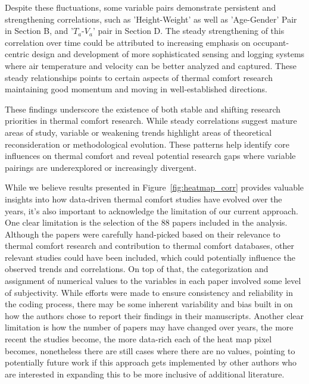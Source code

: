 \documentclass[final,3p,times,12pt]{elsarticle}
\begin{document}
Despite these fluctuations, some variable pairs demonstrate persistent and strengthening correlations, such as 'Height-Weight' as well as 'Age-Gender' Pair in Section B, and '$T_a$-$V_a$' pair in Section D. The steady strengthening of this correlation over time could be attributed to increasing emphasis on occupant-centric design and development of more sophisticated sensing and logging systems where air temperature and velocity can be better analyzed and captured. These steady relationships points to certain aspects of thermal comfort research maintaining good momentum and moving in well-established directions. 

These findings underscore the existence of both stable and shifting research priorities in thermal comfort research. While steady correlations suggest mature areas of study, variable or weakening trends highlight areas of theoretical reconsideration or methodological evolution. These patterns help identify core influences on thermal comfort and reveal potential research gaps where variable pairings are underexplored or increasingly divergent.

While we believe results presented in Figure~\ref{fig:heatmap_corr} provides valuable insights into how data-driven thermal comfort studies have evolved over the years, it's also important to acknowledge the limitation of our current approach. One clear limitation is the selection of the 88 papers included in the analysis. Although the papers were carefully hand-picked based on their relevance to thermal comfort research and contribution to thermal comfort databases, other relevant studies could have been included, which could potentially influence the observed trends and correlations. On top of that, the categorization and assignment of numerical values to the variables in each paper involved some level of subjectivity. While efforts were made to ensure consistency and reliability in the coding process, there may be some inherent variability and bias built in on how the authors chose to report their findings in their manuscripts. Another clear limitation is how the number of papers may have changed over years, the more recent the studies become, the more data-rich each of the heat map pixel becomes, nonetheless there are still cases where there are no values, pointing to potentially future work if this approach gets implemented by other authors who are interested in expanding this to be more inclusive of additional literature. 

\end{document}
